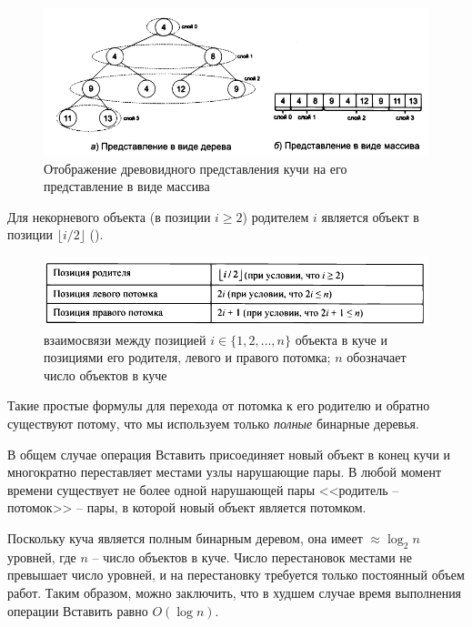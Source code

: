 \documentclass[%
	11pt,
	a4paper,
	utf8,
		]{article}
\begin{document}
\begin{figure}[h]
	\centering
	\includegraphics[scale=0.85]{figures/heap_tree_array.png}
	\caption{ Отображение древовидного представления кучи на его представление в виде массива }\label{fig:heap_tree_array}
\end{figure}

Для некорневого объекта (в позиции $ i \geqslant 2 $) родителем $ i $ является объект в позиции $ \lfloor i/2 \rfloor $ ().

\begin{figure}[h]
	\centering
	\includegraphics[scale=0.85]{figures/heap_pos.png}
	\caption{ взаимосвязи между позицией $ i \in \{ 1, 2, \ldots, n \} $ объекта в куче и позициями его родителя, левого и правого потомка; $ n $ обозначает число объектов в куче }\label{fig:heap_pos}
\end{figure}

Такие простые формулы для перехода от потомка к его родителю и обратно существуют потому, что мы используем только \emph{полные} бинарные деревья.

В общем случае операция \textsf{Вставить} присоединяет новый объект в конец кучи и многократно переставляет местами узлы нарушающие пары. В любой момент времени существует не более одной нарушающей пары <<родитель -- потомок>> -- пары, в которой новый объект является потомком.

Поскольку куча является полным бинарным деревом, она имеет $ \approx \log_2 n $ уровней, где $ n $ -- число объектов в куче. Число перестановок местами не превышает число уровней, и на перестановку требуется только постоянный объем работ. Таким образом, можно заключить, что в худшем случае время выполнения операции \textsf{Вставить} равно $ O(\log n) $.
\end{document}
